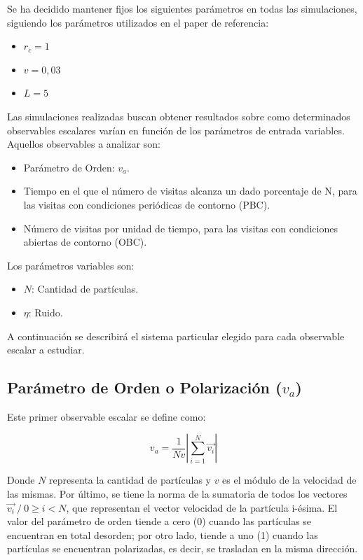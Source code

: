 \documentclass[11pt, a4paper]{article}
\begin{document}
        Se ha decidido mantener fijos los siguientes parámetros en todas las simulaciones, siguiendo los parámetros utilizados en el paper de referencia:
        \begin{itemize}
            \item $r_c = 1$
            \item $v = 0,03$
            \item $L = 5$
        \end{itemize}

        Las simulaciones realizadas buscan obtener resultados sobre como determinados observables escalares varían
        en función de los parámetros de entrada variables.
        Aquellos observables a analizar son:
        \begin{itemize}
            \item Parámetro de Orden: $v_a$.
            \item Tiempo en el que el número de visitas alcanza un dado porcentaje de N, para las visitas con condiciones periódicas de contorno (PBC).
            \item Número de visitas por unidad de tiempo, para las visitas con condiciones abiertas de contorno (OBC).
        \end{itemize}

        Los parámetros variables son:

        \begin{itemize}
            \item $N$: Cantidad de partículas.
            \item $\eta$: Ruido.
        \end{itemize}

        A continuación se describirá el sistema particular elegido para cada observable escalar a estudiar.

        \subsection{Parámetro de Orden o Polarización ($v_a$)}
        \label{subsec:polarizacion}

            Este primer observable escalar se define como:

            \begin{equation}
                v_a = \frac{1}{Nv} \left|\sum_{i=1}^{N} \vec{v_i} \right|
            \end{equation}

            Donde $N$ representa la cantidad de partículas y $v$ es el módulo de la velocidad de las mismas.
            Por último, se tiene la norma de la sumatoria de todos los vectores $\vec{v_i} \ / \  0 \geq i < N$,
            que representan el vector velocidad de la partícula i-ésima.
            El valor del parámetro de orden tiende a cero (0) cuando las partículas se encuentran en total desorden;
            por otro lado, tiende a uno (1) cuando las partículas se encuentran polarizadas, es decir, se trasladan en la misma dirección.
\end{document}
